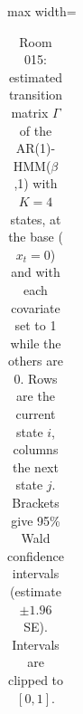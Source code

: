 \begin{table}[H]
\begin{adjustbox}{max width=\textwidth}
\begin{tabular}{lcccc|cccc|cccc}
\hline
\end{tabular}
\end{adjustbox}
\caption{Room 015: estimated transition matrix $\Gamma$ of the AR(1)-HMM($\beta$,1) with $K=4$ states, at the base ($x_t = 0$) and with each covariate set to 1 while the others are 0. Rows are the current state $i$, columns the next state $j$. Brackets give 95\% Wald confidence intervals (estimate $\pm 1.96$ SE). Intervals are clipped to $[0, 1]$.}
\label{tab:params_transition_room_015_calibrated_anchor_ar1_hmm_beta_1_K4}
\end{table}
